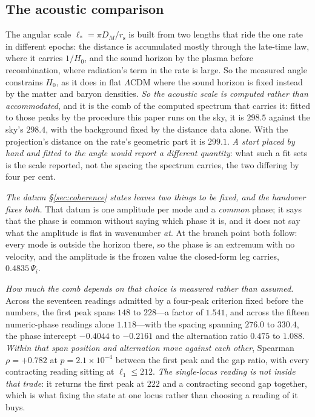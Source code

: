 \documentclass[11pt,a4paper]{article}
\theoremstyle{plain}
\theoremstyle{definition}
\theoremstyle{remark}
\newcommand{\rs}{r_{\mathrm{s}}}
\begin{document}
\subsection{The acoustic comparison}\label{sec:refit-bound}
The angular scale $\ell_{*}=\pi D_{M}/\rs$ is built from two lengths that ride the one rate in different
epochs: the distance is accumulated mostly through the late-time law, where it carries $1/H_{0}$, and the sound
horizon by the plasma before recombination, where radiation's term in the rate is large. So the measured angle
constrains $H_{0}$, as it does in
flat $\Lambda$CDM where the sound horizon is fixed instead by the matter and baryon
densities. \emph{So the acoustic scale is computed rather than accommodated}, and it is the comb of the computed
spectrum that carries it: fitted to those peaks by the procedure this paper runs on the sky, it is $298.5$
against the sky's $298.4$, with the background fixed by the distance data
alone. With the projection's distance on the rate's geometric part it is $299.1$. \emph{A start placed by hand and fitted to the
angle would report a different quantity}: what such a fit sets is the scale reported, not the spacing the
spectrum carries, the two differing by four per cent.

\emph{The datum \S\ref{sec:coherence} states leaves two things to be fixed, and the handover fixes both.} That
datum is one amplitude per mode and a \emph{common} phase; it says that the phase is common without saying
which phase it is, and it does not say what the amplitude is flat in wavenumber \emph{at}. At the branch point
both follow: every mode is outside the horizon there, so the phase is an extremum with no velocity, and the
amplitude is the frozen value the closed-form leg carries, $0.4835\,\Psi_i$.

\emph{How much the comb depends on that choice is measured rather than assumed.} Across the seventeen
readings admitted by a four-peak criterion fixed before the numbers, the first peak spans $148$ to $228$---a
factor of $1.541$, and across the fifteen numeric-phase readings alone $1.118$---with the spacing spanning
$276.0$ to $330.4$, the phase intercept $-0.4044$ to $-0.2161$ and the alternation ratio $0.475$ to $1.088$.
\emph{Within that span position and alternation move against each other}, Spearman $\rho=+0.782$ at
$p=2.1\times10^{-4}$ between the first peak and the gap ratio, with every contracting reading sitting at
$\ell_1\le212$. \emph{The single-locus reading is not inside that trade}: it returns the first peak at $222$
and a contracting second gap together, which is what fixing the state at one locus rather than choosing a
reading of it buys.
\end{document}
